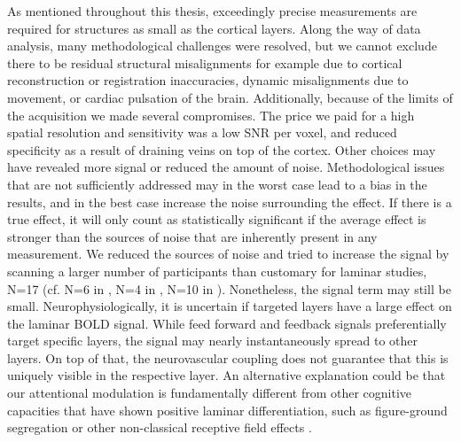 As mentioned throughout this thesis, exceedingly precise measurements are required for structures as small as the cortical layers. Along the way of data analysis, many methodological challenges were resolved, but we cannot exclude there to be residual structural misalignments for example due to cortical reconstruction or registration inaccuracies, dynamic misalignments due to movement, or cardiac pulsation of the brain. Additionally, because of the limits of the acquisition we made several compromises. The price we paid for a high spatial resolution and sensitivity was a low SNR per voxel, and reduced specificity as a result of draining veins on top of the cortex. Other choices may have revealed more signal or reduced the amount of noise. Methodological issues that are not sufficiently addressed may in the worst case lead to a bias in the results, and in the best case increase the noise surrounding the effect. If there is a true effect, it will only count as statistically significant if the average effect is stronger than the sources of noise that are inherently present in any measurement. We reduced the sources of noise and tried to increase the signal by scanning a larger number of participants than customary for laminar studies, N=17 (cf. N=6 in \cite{Polimeni2010}, N=4 in \cite{Muckli2015}, N=10 in \cite{Kok2016}). Nonetheless, the signal term may still be small. Neurophysiologically, it is uncertain if targeted layers have a large effect on the laminar BOLD signal. While feed forward and feedback signals preferentially target specific layers, the signal may nearly instantaneously spread to other layers. On top of that, the neurovascular coupling does not guarantee that this is uniquely visible in the respective layer. An alternative explanation could be that our attentional modulation is fundamentally different from other cognitive capacities that have shown positive laminar differentiation, such as figure-ground segregation \cite{Kok2015} or other non-classical receptive field effects \cite{Muckli2015}.

